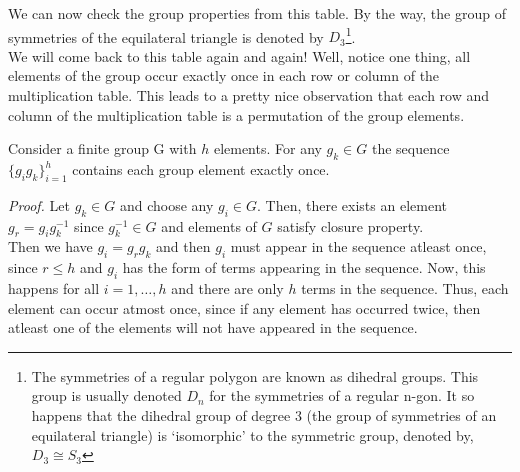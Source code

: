 \noindent
We can now check the group properties from this table. By the way, the group of symmetries of the equilateral triangle is denoted by $D_3$\footnote{The symmetries of a regular polygon are known as dihedral groups. This group is usually denoted $D_n$ for the symmetries of a regular n-gon. It so happens that the dihedral group of degree 3 (the group of symmetries of an equilateral triangle) is `isomorphic' to the symmetric group, denoted by, $D_3 \cong S_3$}.\\[0.3cm]We will come back to this table again and again! Well, notice one thing, all elements of the group occur exactly once in each row or column of the multiplication table. This leads to a pretty nice observation that each row and column of the multiplication table is a permutation of the group elements. 
\begin{ffact}
Consider a finite group G with $h$ elements. For any $g_k\in G$ the sequence $\{g_ig_k\}_{i=1}^h$ contains each group element exactly once. 
\end{ffact}
\textit{Proof.} Let $g_k\in G$ and choose any $g_i\in G$. Then, there exists an element $g_r = g_ig_k^{-1}$ since $g_k^{-1}\in G$ and elements of $G$ satisfy closure property.\\[0.2cm] Then we have $g_i = g_r g_k$ and then $g_i$ must appear in the sequence atleast once, since $r\leq h$ and $g_i$ has the form of terms appearing in the sequence. Now, this happens for all $i=1,\ldots,h$ and there are only $h$ terms in the sequence. Thus, each element can occur atmost once, since if any element has occurred twice, then atleast one of the elements will not have appeared in the sequence. 
